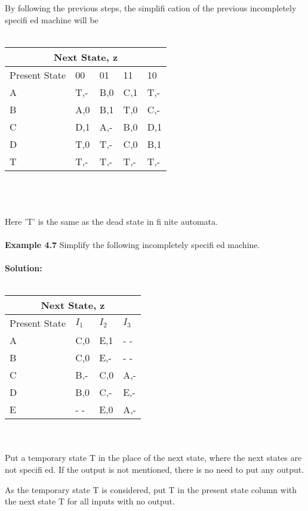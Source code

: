 \documentclass[12pt,a4paper,openany]{book}
\begin{document}
By following the previous steps, the simpliﬁ cation of the previous incompletely speciﬁ ed machine will be
\\
\\
\begin{tabular}{ |p{3cm}|p{2cm}|p{2cm}|p{2cm}|p{2cm}| }
\hline
\multicolumn{5}{|c|}{Next State, z} \\
\hline
Present State  &   00   &   01    &   11   &   10   \\
\hline
A  &   T,-   &   B,0    &   C,1   &   T,-   \\
B  &   A,0   &   B,1    &   T,0   &   C,-   \\
C  &   D,1   &   A,-    &   B,0   &   D,1   \\
D  &   T,0   &  T,-    &   C,0   &   B,1   \\
T  &   T,-   &  T,-    &   T,-   &   T,-   \\
\hline
\end{tabular}
\\
\\
\\
Here 'T' is the same as the dead state in ﬁ nite automata.
\\
\\
\textbf{Example 4.7} Simplify the following incompletely speciﬁ ed machine.
\\
\\
\textbf{Solution:}
\\
\\
\begin{tabular}{ |p{3cm}|p{2cm}|p{2cm}|p{2cm}| }
\hline
\multicolumn{4}{|c|}{Next State, z} \\
\hline
Present State  &   $I_1$   &   $I_2$    &   $I_3$   \\
\hline
A  &   C,0  &   E,1  &   - -   \\
B  &   C,0  &   E,-   &   - -   \\
C  &   B,-   &   C,0   &   A,-   \\
D  &   B,0  &  C,-   &   E,-   \\
E  &   - -   &  E,0    &   A,-   \\
\hline
\end{tabular}
\\
\\

Put a temporary state T in the place of the next state, where the next states are not speciﬁ ed. If the output is not mentioned, there is no need to put any output.

As the temporary state T is considered, put T in the present state column with the next state T for all inputs with no output.
\end{document}
